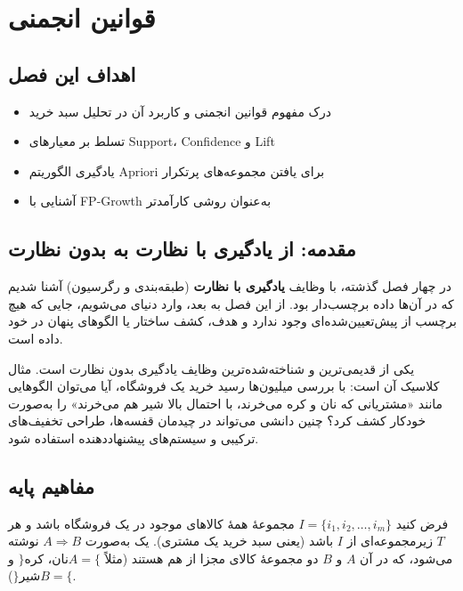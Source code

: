 \chapter{قوانین انجمنی}
\label{ch:association}

\section*{اهداف این فصل}
\begin{itemize}
    \item درک مفهوم قوانین انجمنی و کاربرد آن در تحلیل سبد خرید
    \item تسلط بر معیارهای Support، Confidence و Lift
    \item یادگیری الگوریتم Apriori برای یافتن مجموعه‌های پرتکرار
    \item آشنایی با FP-Growth به‌عنوان روشی کارآمدتر
\end{itemize}

\section{مقدمه: از یادگیری با نظارت به بدون نظارت}

در چهار فصل گذشته، با وظایف \textbf{یادگیری با نظارت} (طبقه‌بندی و
رگرسیون) آشنا شدیم که در آن‌ها داده برچسب‌دار بود. از این فصل به بعد،
وارد دنیای 
می‌شویم، جایی که هیچ برچسب از پیش‌تعیین‌شده‌ای وجود ندارد و هدف، کشف
ساختار یا الگوهای پنهان در خود داده است.

 یکی از قدیمی‌ترین و
شناخته‌شده‌ترین وظایف یادگیری بدون نظارت است. مثال کلاسیک آن
 است: با بررسی
میلیون‌ها رسید خرید یک فروشگاه، آیا می‌توان الگوهایی مانند «مشتریانی که
نان و کره می‌خرند، با احتمال بالا شیر هم می‌خرند» را به‌صورت خودکار کشف
کرد؟ چنین دانشی می‌تواند در چیدمان قفسه‌ها، طراحی تخفیف‌های ترکیبی و
سیستم‌های پیشنهاددهنده استفاده شود.

\section{مفاهیم پایه}

فرض کنید $I = \{i_1, i_2, \ldots, i_m\}$ مجموعهٔ همهٔ کالاهای موجود در
یک فروشگاه باشد و هر  $T$ زیرمجموعه‌ای از
$I$ باشد (یعنی سبد خرید یک مشتری). یک  به‌صورت $A \Rightarrow B$ نوشته می‌شود، که در آن $A$ و $B$ دو
مجموعهٔ کالای مجزا از هم هستند (مثلاً $A = \{$نان، کره$\}$ و
$B = \{$شیر$\}$).


